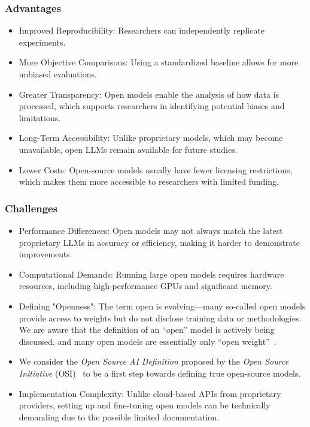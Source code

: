 \subsubsection{Advantages}
\begin{itemize}
    \item	Improved Reproducibility: Researchers can independently replicate experiments.
    \item	More Objective Comparisons: Using a standardized baseline allows for more unbiased evaluations.
    \item	Greater Transparency: Open models enable the analysis of how data is processed, which supports researchers in identifying potential biases and limitations.
    \item	Long-Term Accessibility: Unlike proprietary models, which may become unavailable, open LLMs remain available for future studies.
    \item	Lower Costs: Open-source models usually have fewer licensing restrictions, which makes them more accessible to researchers with limited funding.
\end{itemize}


\subsubsection{Challenges}
\begin{itemize}
    \item Performance Differences: Open models may not always match the latest proprietary LLMs in accuracy or efficiency, making it harder to demonstrate improvements.
    \item Computational Demands: Running large open models requires hardware resources, including high-performance GPUs and significant memory.
    \item Defining "Openness": The term open is evolving—many so-called open models provide access to weights but do not disclose training data or methodologies. We are aware that the definition of an ``open'' model is actively being discussed, and many open models are essentially only ``open weight''~\cite{Gibney2024}.
    \item We consider the \emph{Open Source AI Definition} proposed by the \emph{Open Source Initiative} (OSI)~\cite{OSIAI2024} to be a first step towards defining true open-source models.
    \item Implementation Complexity: Unlike cloud-based APIs from proprietary providers, setting up and fine-tuning open models can be technically demanding due to the possible limited documentation.
\end{itemize}

